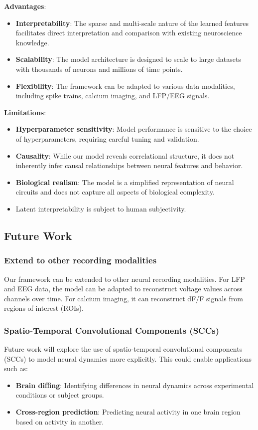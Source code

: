 \textbf{Advantages}:
\begin{itemize}
    \item \textbf{Interpretability}: The sparse and multi-scale nature of the learned features facilitates direct interpretation and comparison with existing neuroscience knowledge.
    \item \textbf{Scalability}: The model architecture is designed to scale to large datasets with thousands of neurons and millions of time points.
    \item \textbf{Flexibility}: The framework can be adapted to various data modalities, including spike trains, calcium imaging, and LFP/EEG signals.
\end{itemize}

\textbf{Limitations}:
\begin{itemize}
    \item \textbf{Hyperparameter sensitivity}: Model performance is sensitive to the choice of hyperparameters, requiring careful tuning and validation.
    \item \textbf{Causality}: While our model reveals correlational structure, it does not inherently infer causal relationships between neural features and behavior.
    \item \textbf{Biological realism}: The model is a simplified representation of neural circuits and does not capture all aspects of biological complexity.
    \item Latent interpretability is subject to human subjectivity.
\end{itemize}

\subsection{Future Work}

\subsubsection{Extend to other recording modalities}
Our framework can be extended to other neural recording modalities. For LFP and EEG data, the model can be adapted to reconstruct voltage values across channels over time. For calcium imaging, it can reconstruct dF/F signals from regions of interest (ROIs).

\subsubsection{Spatio-Temporal Convolutional Components (SCCs)}
Future work will explore the use of spatio-temporal convolutional components (SCCs) to model neural dynamics more explicitly. This could enable applications such as:
\begin{itemize}
    \item \textbf{Brain diffing}: Identifying differences in neural dynamics across experimental conditions or subject groups.
    \item \textbf{Cross-region prediction}: Predicting neural activity in one brain region based on activity in another.
\end{itemize}


